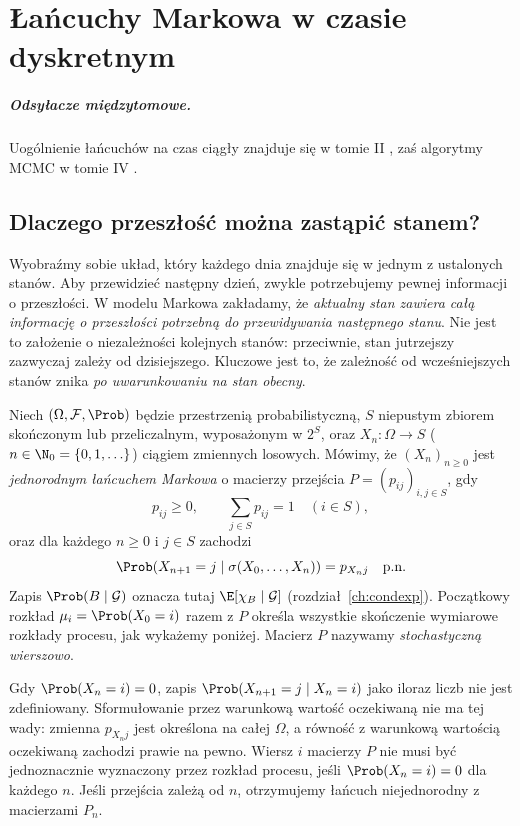 \chapter{Łańcuchy Markowa w czasie dyskretnym}
\label{ch:markov}
\paragraph{Odsyłacze międzytomowe.}
Uogólnienie łańcuchów na czas ciągły znajduje się w tomie II
,
zaś algorytmy MCMC w tomie IV
.


\section{Dlaczego przeszłość można zastąpić stanem?}

Wyobraźmy sobie układ, który każdego dnia znajduje się w jednym
z ustalonych stanów. Aby przewidzieć następny dzień, zwykle
potrzebujemy pewnej informacji o przeszłości. W modelu Markowa
zakładamy, że \emph{aktualny stan zawiera całą informację o
przeszłości potrzebną do przewidywania następnego stanu}.
Nie jest to założenie o niezależności kolejnych stanów: przeciwnie,
stan jutrzejszy zazwyczaj zależy od dzisiejszego. Kluczowe jest
to, że zależność od wcześniejszych stanów znika \emph{po
uwarunkowaniu na stan obecny}.

\begin{definicja}
Niech $(\Omega,\mathcal F,\Prob)$ będzie przestrzenią
probabilistyczną, $S$ niepustym zbiorem skończonym lub
przeliczalnym, wyposażonym w $2^S$, oraz
$X_n:\Omega\to S$ ($n\in\N_0=\{0,1,\ldots\}$)
ciągiem zmiennych losowych.
Mówimy, że $(X_n)_{n\geq0}$ jest \emph{jednorodnym
łańcuchem Markowa} o macierzy przejścia
$P=(p_{ij})_{i,j\in S}$, gdy
\[
 p_{ij}\geq0,\qquad \sum_{j\in S}p_{ij}=1
 \quad(i\in S),
\]
oraz dla każdego $n\geq0$ i $j\in S$ zachodzi
\[
\Prob(X_{n+1}=j\mid\sigma(X_0,\ldots,X_n))
=p_{X_nj}\quad\text{p.n.}
\]
Zapis $\Prob(B\mid\mathcal G)$ oznacza tutaj
$\E[\chi_B\mid\mathcal G]$ (rozdział~\ref{ch:condexp}).
Początkowy rozkład $\mu_i=\Prob(X_0=i)$
razem z $P$ określa wszystkie skończenie wymiarowe
rozkłady procesu, jak wykażemy poniżej. Macierz $P$ nazywamy
\emph{stochastyczną wierszowo}.
\end{definicja}

\begin{uwaga}
Gdy $\Prob(X_n=i)=0$, zapis
$\Prob(X_{n+1}=j\mid X_n=i)$ jako iloraz liczb
nie jest zdefiniowany. Sformułowanie przez
warunkową wartość oczekiwaną nie ma tej wady:
zmienna $p_{X_nj}$ jest określona na całej $\Omega$,
a równość z warunkową wartością oczekiwaną zachodzi
prawie na pewno. Wiersz $i$ macierzy $P$ nie musi być
jednoznacznie wyznaczony przez rozkład procesu, jeśli
$\Prob(X_n=i)=0$ dla każdego $n$. Jeśli przejścia zależą
od $n$, otrzymujemy łańcuch niejednorodny
z macierzami $P_n$.
\end{uwaga}


